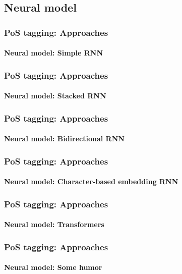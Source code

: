 \documentclass[xcolor=table]{beamer}
\begin{document}
\subsection{Neural model}

\begin{frame}
\frametitle{PoS tagging: Approaches}
\framesubtitle{Neural model: Simple RNN}


\end{frame}

\begin{frame}
\frametitle{PoS tagging: Approaches}
\framesubtitle{Neural model: Stacked RNN}


\end{frame}

\begin{frame}
\frametitle{PoS tagging: Approaches}
\framesubtitle{Neural model: Bidirectional RNN}


\end{frame}

\begin{frame}
\frametitle{PoS tagging: Approaches}
\framesubtitle{Neural model: Character-based embedding RNN}


\end{frame}

\begin{frame}
	\frametitle{PoS tagging: Approaches}
	\framesubtitle{Neural model: Transformers}
	
	
\end{frame}

\begin{frame}
\frametitle{PoS tagging: Approaches}
\framesubtitle{Neural model: Some humor}

\begin{center}
\end{center}

\end{frame}

\end{document}
